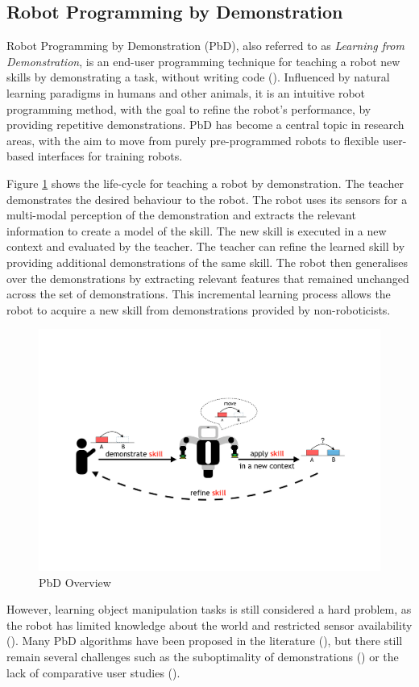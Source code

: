\subsection{Robot Programming by Demonstration}
Robot Programming by Demonstration (PbD), also referred to as \textit{Learning from Demonstration}, is an end-user programming technique for teaching a robot new skills by demonstrating a task, without writing code (\cite{billard2008robot}).
Influenced by natural learning paradigms in humans and other animals, it is an intuitive robot programming method, with the goal to refine the robot's performance, by providing repetitive demonstrations.
PbD has become a central topic in research areas, with the aim to move from purely pre-programmed robots to flexible user-based interfaces for training robots.

Figure \ref{fig:Principle Overview} shows the life-cycle for teaching a robot by demonstration.
The teacher demonstrates the desired behaviour to the robot.
The robot uses its sensors for a multi-modal perception of the demonstration and extracts the relevant information to create a model of the skill.
The new skill is executed in a new context and evaluated by the teacher.
The teacher can refine the learned skill by providing additional demonstrations of the same skill.
The robot then generalises over the demonstrations by extracting relevant features that remained unchanged across the set of demonstrations.
This incremental learning process allows the robot to acquire a new skill from demonstrations provided by non-roboticists.

\begin{figure}[h]
	\centering
	\includegraphics[width=0.63\linewidth]{figures/PbD-Overview}
	\caption{PbD Overview}
	\label{fig:Principle Overview}
\end{figure}

However, learning object manipulation tasks is still considered a hard problem, as the robot has limited knowledge about the world and restricted sensor availability (\cite{ekvall2008robot}).
Many PbD algorithms have been proposed in the literature (\cite{argall2009survey,billing2010formalism}), but there still remain several challenges such as the suboptimality of demonstrations (\cite{chen2003programing,kaiser1995obtaining}) or the lack of comparative user studies (\cite{suay2012practical}).

